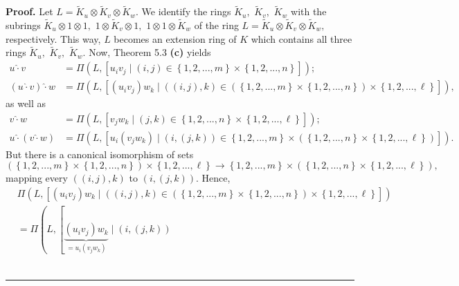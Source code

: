 \documentclass[numbers=enddot,12pt,final,onecolumn,notitlepage]{scrartcl}%
\newenvironment{proof}[1][Proof]{\noindent\textbf{#1.} }{\ \rule{0.5em}{0.5em}}
\begin{document}
\begin{proof}
Let $L=\widetilde{K}_{u}\otimes\widetilde{K}_{v}\otimes\widetilde{K}_{w}$. We
identify the rings $\widetilde{K}_{u},$ $\widetilde{K}_{v},$ $\widetilde{K}%
_{w}$ with the subrings $\widetilde{K}_{u}\otimes1\otimes1,$ $1\otimes
\widetilde{K}_{v}\otimes1,$ $1\otimes1\otimes\widetilde{K}_{w}$ of the ring
$L=\widetilde{K}_{u}\otimes\widetilde{K}_{v}\otimes\widetilde{K}_{w},$
respectively. This way, $L$ becomes an extension ring of $K$ which contains
all three rings $\widetilde{K}_{u},$ $\widetilde{K}_{v},$ $\widetilde{K}_{w}.$
Now, Theorem 5.3 \textbf{(c)} yields%
\begin{align*}
u\widehat{\cdot}v  &  =\Pi\left(  L,\left[  u_{i}v_{j}\mid\left(  i,j\right)
\in\left\{  1,2,...,m\right\}  \times\left\{  1,2,...,n\right\}  \right]
\right)  ;\\
\left(  u\widehat{\cdot}v\right)  \widehat{\cdot}w  &  =\Pi\left(  L,\left[
\left(  u_{i}v_{j}\right)  w_{k}\mid\left(  \left(  i,j\right)  ,k\right)
\in\left(  \left\{  1,2,...,m\right\}  \times\left\{  1,2,...,n\right\}
\right)  \times\left\{  1,2,...,\ell\right\}  \right]  \right)  ,
\end{align*}
as well as%
\begin{align*}
v\widehat{\cdot}w  &  =\Pi\left(  L,\left[  v_{j}w_{k}\mid\left(  j,k\right)
\in\left\{  1,2,...,n\right\}  \times\left\{  1,2,...,\ell\right\}  \right]
\right)  ;\\
u\widehat{\cdot}\left(  v\widehat{\cdot}w\right)   &  =\Pi\left(  L,\left[
u_{i}\left(  v_{j}w_{k}\right)  \mid\left(  i,\left(  j,k\right)  \right)
\in\left\{  1,2,...,m\right\}  \times\left(  \left\{  1,2,...,n\right\}
\times\left\{  1,2,...,\ell\right\}  \right)  \right]  \right)  .
\end{align*}
But there is a canonical isomorphism of sets%
\[
\left(  \left\{  1,2,...,m\right\}  \times\left\{  1,2,...,n\right\}  \right)
\times\left\{  1,2,...,\ell\right\}  \rightarrow\left\{  1,2,...,m\right\}
\times\left(  \left\{  1,2,...,n\right\}  \times\left\{  1,2,...,\ell\right\}
\right)  ,
\]
mapping every $\left(  \left(  i,j\right)  ,k\right)  $ to $\left(  i,\left(
j,k\right)  \right)  $. Hence,%
\begin{align*}
&  \Pi\left(  L,\left[  \left(  u_{i}v_{j}\right)  w_{k}\mid\left(  \left(
i,j\right)  ,k\right)  \in\left(  \left\{  1,2,...,m\right\}  \times\left\{
1,2,...,n\right\}  \right)  \times\left\{  1,2,...,\ell\right\}  \right]
\right) \\
&  =\Pi\left(  L,\left[  \underbrace{\left(  u_{i}v_{j}\right)  w_{k}}%
_{=u_{i}\left(  v_{j}w_{k}\right)  }\mid\left(  i,\left(  j,k\right)  \right)

\end{align*}
\end{proof}
\end{document}
